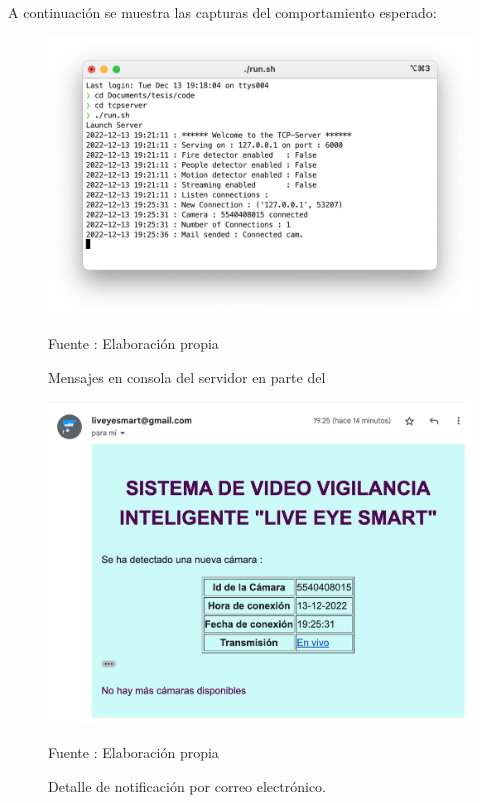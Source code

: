 A continuación se muestra las capturas del comportamiento esperado:\\

\begin{figure}[H]
    \begin{center}
        \includegraphics[width=12cm]{img/capitulo_6/server_cam_connected.png}
    \end{center}
    \begin{center}
        \caption{Mensajes en consola del servidor en parte del}
        Fuente : Elaboración propia
    \end{center}
\end{figure}

\begin{figure}[H]
    \begin{center}
        \includegraphics[width=12cm]{img/capitulo_6/mail1.png}
    \end{center}
    \begin{center}
        \caption{Detalle de notificación por correo electrónico.}
        Fuente : Elaboración propia
    \end{center}
\end{figure}

